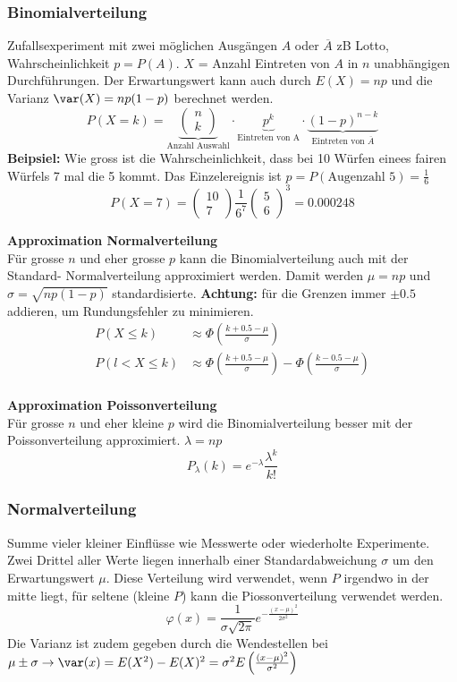 \subsubsection{Binomialverteilung}
Zufallsexperiment mit zwei möglichen Ausgängen $A$ oder $\overline{A}$ zB Lotto, Wahrscheinlichkeit $p = P(A)$. $X$ = Anzahl Eintreten von $A$ in $n$ unabhängigen Durchführungen. Der Erwartungswert kann auch durch $E(X) = np$ und die Varianz $\var(X) = np(1 - p)$ berechnet werden.
\[
P(X = k) = \underbrace{\begin{pmatrix}	n \\ k \end{pmatrix}}_{\text{Anzahl Auswahl}}\cdot \underbrace{p^k}_{\text{Eintreten von A}}\cdot\underbrace{(1-p)^{n-k}}_{\text{Eintreten von }\overline{A
}}
\]
\noindent\textbf{Beipsiel:} Wie gross ist die Wahrscheinlichkeit, dass bei 10 Würfen einees fairen Würfels 7 mal die 5 kommt. Das Einzelereignis ist $p = P(\text{Augenzahl } 5) = \frac{1}{6}$
\[
P (X = 7) = \begin{pmatrix}	10 \\ 7 \end{pmatrix} \frac{1}{6^7}\begin{pmatrix}	5 \\ 6 \end{pmatrix}^3 = 0.000248
\]

\textbf{Approximation Normalverteilung}\\
Für grosse $n$ und eher grosse $p$ kann die Binomialverteilung auch mit der Standard- Normalverteilung approximiert werden. Damit werden $\mu = np$ und $\sigma = \sqrt{np(1-p)}$ standardisierte. \textbf{Achtung:} für die Grenzen immer $\pm 0.5$ addieren, um Rundungsfehler zu minimieren.
\begin{align*}
	P(X \leq k) &\approx \Phi(\frac{k + 0.5 - \mu}{\sigma}) \\
	P(l < X \leq k) &\approx \Phi(\frac{k + 0.5 - \mu}{\sigma})  - \Phi(\frac{k - 0.5 - \mu}{\sigma}) \\
\end{align*}

\textbf{Approximation Poissonverteilung}\\
Für grosse $n$ und eher kleine $p$ wird die Binomialverteilung besser mit der Poissonverteilung approximiert. $\lambda = np$
\[
P_\lambda(k) = e^{-\lambda}\frac{\lambda^k}{k!}
\]


\subsubsection{Normalverteilung}
Summe vieler kleiner Einflüsse wie Messwerte oder wiederholte Experimente. Zwei Drittel aller Werte liegen innerhalb einer Standardabweichung $\sigma$ um den Erwartungswert $\mu$. Diese Verteilung wird verwendet, wenn $P$ irgendwo in der mitte liegt, für seltene (kleine $P$) kann die Piossonverteilung verwendet werden.
\[
\varphi(x) = \frac{1}{\sigma\sqrt{2\pi}}e^{-\frac{(x-\mu)^2}{2\sigma^2}}
\]
\noindent Die Varianz ist zudem gegeben durch die Wendestellen bei $\mu \pm \sigma \rightarrow \var(x) = E(X^2) - E(X)^2 = \sigma^2E\left(\frac{(x - \mu)^2}{\sigma^2}\right)$

